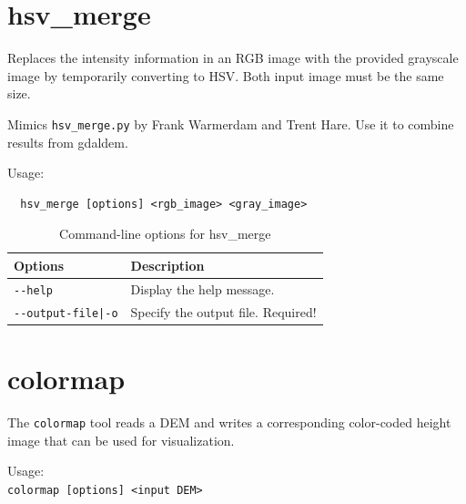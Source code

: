 \section{hsv\_merge}
\label{hsvmerge}

Replaces the intensity information in an RGB image with the provided grayscale image
by temporarily converting to HSV.  Both input image must be the same size.

Mimics \texttt{hsv\_merge.py} by Frank Warmerdam and Trent Hare. Use it to combine results from gdaldem.

\medskip

Usage:
\begin{verbatim}
  hsv_merge [options] <rgb_image> <gray_image>
\end{verbatim}

\medskip

\begin{longtable}{|l|p{10cm}|}
\caption{Command-line options for hsv\_merge}
\label{tbl:hsvmerge}
\endfirsthead
\endhead
\endfoot
\endlastfoot
\hline
Options & Description \\ \hline \hline
\texttt{-\/-help} & Display the help message.\\ \hline
\texttt{-\/-output-file|-o} & Specify the output file.  Required!\\ \hline
\end{longtable}


\section{colormap}
\label{sec:colormap}

The \verb#colormap# tool reads a DEM and writes a corresponding color-coded height image that can be used for visualization.


\medskip

Usage:\\
\hspace*{2em}\texttt{colormap [options] <input DEM>}

\medskip


